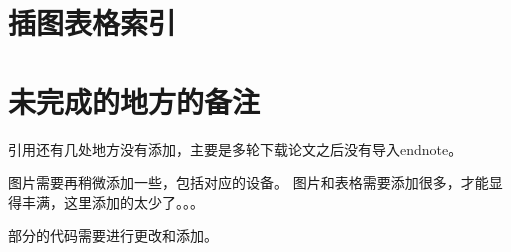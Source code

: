 \chapter{插图表格索引}
\listoffigures
\listoftables

\chapter{未完成的地方的备注}
引用还有几处地方没有添加，主要是多轮下载论文之后没有导入endnote。

图片需要再稍微添加一些，包括对应的设备。
图片和表格需要添加很多，才能显得丰满，这里添加的太少了。。。


部分的代码需要进行更改和添加。
